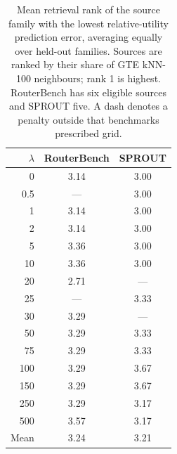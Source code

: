 \begin{table}[H]
\centering
\small
\setlength{\tabcolsep}{5pt}
\caption{Mean retrieval rank of the source family with the lowest relative-utility prediction error, averaging equally over held-out families. Sources are ranked by their share of GTE kNN-100 neighbours; rank 1 is highest. RouterBench has six eligible sources and SPROUT five. A dash denotes a penalty outside that benchmarks prescribed grid.}
\label{tab:utility-family-rank}
\begin{tabular}{@{}rcc@{}}
\toprule
$\lambda$ & RouterBench & SPROUT \\
\midrule
0 & 3.14 & 3.00 \\
0.5 & --- & 3.00 \\
1 & 3.14 & 3.00 \\
2 & 3.14 & 3.00 \\
5 & 3.36 & 3.00 \\
10 & 3.36 & 3.00 \\
20 & 2.71 & --- \\
25 & --- & 3.33 \\
30 & 3.29 & --- \\
50 & 3.29 & 3.33 \\
75 & 3.29 & 3.33 \\
100 & 3.29 & 3.67 \\
150 & 3.29 & 3.67 \\
250 & 3.29 & 3.17 \\
500 & 3.57 & 3.17 \\
\midrule
Mean & 3.24 & 3.21 \\
\bottomrule
\end{tabular}
\end{table}
